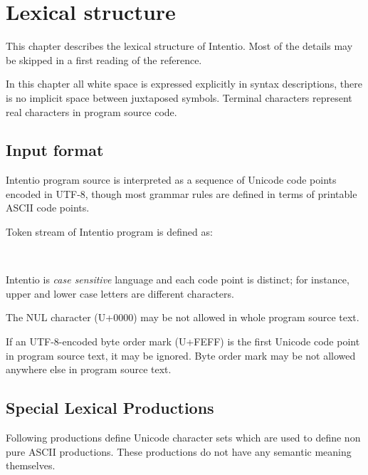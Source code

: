 \chapter{Lexical structure}

This chapter describes the lexical structure of Intentio. Most of the details may be skipped in a first reading of the reference.

In this chapter all white space is expressed explicitly in syntax descriptions, there is no implicit space between juxtaposed symbols. Terminal characters represent real characters in program source code.

\section{Input format}

Intentio program source is interpreted as a sequence of Unicode code points encoded in UTF-8, though most grammar rules are defined in terms of printable ASCII code points.

Token stream of Intentio program is defined as:

\begin{bnf}
   \eq {} \  \\
        \eq  {}
                  \gor {}
                  \gor {}
                  \gor {}
                  \gor {}
\end{bnf}

Intentio is \emph{case sensitive} language and each code point is distinct; for instance, upper and lower case letters are different characters.

The NUL character (U+0000) may be not allowed in whole program source text.

If an UTF-8-encoded byte order mark (U+FEFF) is the first Unicode code point in program source text, it may be ignored. Byte order mark may be not allowed anywhere else in program source text.

\section{Special Lexical Productions}

Following productions define Unicode character sets which are used to define non pure ASCII productions. These productions do not have any semantic meaning themselves.

